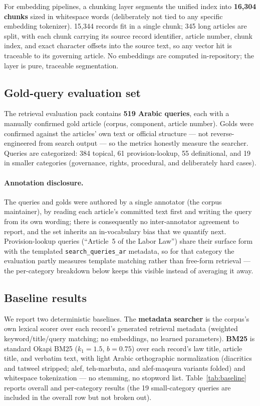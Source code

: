 \documentclass[11pt]{article}
\begin{document}
For embedding pipelines, a chunking layer segments the unified index into
\textbf{16{,}304 chunks} sized in whitespace words (deliberately not tied
to any specific embedding tokenizer). 15{,}344 records fit in a single
chunk; 345 long articles are split, with each chunk carrying its source
record identifier, article number, chunk index, and exact character offsets
into the source text, so any vector hit is traceable to its governing
article. No embeddings are computed in-repository; the layer is pure,
traceable segmentation.

\subsection{Gold-query evaluation set}

The retrieval evaluation pack contains \textbf{519 Arabic queries}, each
with a manually confirmed gold article (corpus, component, article number).
Golds were confirmed against the articles' own text or official structure
--- not reverse-engineered from search output --- so the metrics honestly
measure the searcher. Queries are categorized: 384 topical, 61
provision-lookup, 55 definitional, and 19 in smaller categories
(governance, rights, procedural, and deliberately hard cases).

\paragraph{Annotation disclosure.} The queries and golds were authored by a
single annotator (the corpus maintainer), by reading each article's
committed text first and writing the query from its own wording; there is
consequently no inter-annotator agreement to report, and the set inherits
an in-vocabulary bias that we quantify next. Provision-lookup queries
(``Article~5 of the Labor Law'') share their surface form with the
templated \texttt{search\_queries\_ar} metadata, so for that category the
evaluation partly measures template matching rather than free-form
retrieval --- the per-category breakdown below keeps this visible instead
of averaging it away.

\subsection{Baseline results}

We report two deterministic baselines. The \textbf{metadata searcher} is the
corpus's own lexical scorer over each record's generated retrieval metadata
(weighted keyword/title/query matching; no embeddings, no learned
parameters). \textbf{BM25} is standard Okapi BM25 ($k_1{=}1.5$, $b{=}0.75$)
over each record's law title, article title, and verbatim text, with light
Arabic orthographic normalization (diacritics and tatweel stripped; alef,
teh-marbuta, and alef-maqsura variants folded) and whitespace tokenization
--- no stemming, no stopword list. Table~\ref{tab:baseline} reports overall
and per-category results (the 19 small-category queries are included in the
overall row but not broken out).
\end{document}

